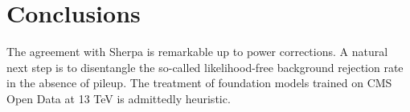 \section{Conclusions}\label{sec:conclusions}

The agreement with Sherpa is remarkable up to power corrections. A
natural next step is to disentangle the so-called likelihood-free
background rejection rate in the absence of pileup. The treatment of
foundation models trained on CMS Open Data at 13 TeV is admittedly
heuristic.


